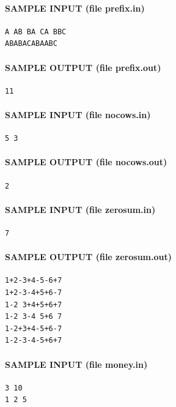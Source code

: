 \documentclass[11pt]{article}
\begin{document}
\paragraph{SAMPLE INPUT (file prefix.in)}
\begin{verbatim}
A AB BA CA BBC
ABABACABAABC
\end{verbatim}

\paragraph{SAMPLE OUTPUT (file prefix.out)}
\begin{verbatim}
11
\end{verbatim}

\paragraph{SAMPLE INPUT (file nocows.in)}
\begin{verbatim}
5 3
\end{verbatim}

\paragraph{SAMPLE OUTPUT (file nocows.out)}
\begin{verbatim}
2
\end{verbatim}

\paragraph{SAMPLE INPUT (file zerosum.in)}
\begin{verbatim}
7
\end{verbatim}

\paragraph{SAMPLE OUTPUT (file zerosum.out)}
\begin{verbatim}
1+2-3+4-5-6+7
1+2-3-4+5+6-7
1-2 3+4+5+6+7
1-2 3-4 5+6 7
1-2+3+4-5+6-7
1-2-3-4-5+6+7
\end{verbatim}

\paragraph{SAMPLE INPUT (file money.in)}
\begin{verbatim}
3 10
1 2 5
\end{verbatim}
\end{document}
